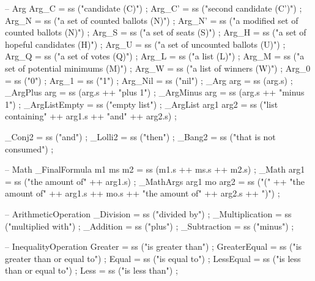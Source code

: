 \begin{lstgf}
{        -- Arg
        Arg_C                           = ss ("candidate (C)") ;
        Arg_C'                          = ss ("second candidate (C')") ;
        Arg_N                           = ss ("a set of counted ballots (N)") ;
        Arg_N'                          = ss ("a modified set of counted ballots (N)") ;
        Arg_S                           = ss ("a set of seats (S)") ;
        Arg_H                           = ss ("a set of hopeful candidates (H)") ;
        Arg_U                           = ss ("a set of uncounted ballots (U)") ;
        Arg_Q                           = ss ("a set of votes (Q)") ;
        Arg_L                           = ss ("a list (L)") ;
        Arg_M                           = ss ("a set of potential minimums (M)") ;
        Arg_W                           = ss ("a list of winners (W)") ;
        Arg_0                           = ss ("0") ;
        Arg_1                           = ss ("1") ;
        Arg_Nil                         = ss ("nil") ;
        _Arg arg                        = ss (arg.s) ;
        _ArgPlus arg                    = ss (arg.s ++ "plus 1") ;
        _ArgMinus arg                   = ss (arg.s ++ "minus 1") ;
        _ArgListEmpty                   = ss ("empty list") ;
        _ArgList arg1 arg2              = ss ("list containing" ++ arg1.s ++ "and" ++ arg2.s) ;
        
        _Conj2                          = ss ("and") ;
        _Lolli2                         = ss ("then") ;
        _Bang2                          = ss ("that is not consumed") ;

        -- Math
        _FinalFormula m1 ms m2          = ss (m1.s ++ ms.s ++ m2.s) ;
        _Math arg1                      = ss ("the amount of" ++ arg1.s) ;
        _MathArgs arg1 mo arg2          = ss ("(" ++ "the amount of" ++ arg1.s ++ mo.s ++ "the amount of" 
		    ++ arg2.s ++ ")") ;

        -- ArithmeticOperation
        _Division                       = ss ("divided by") ;
        _Multiplication                 = ss ("multiplied with") ;
        _Addition                       = ss ("plus") ;
        _Subtraction                    = ss ("minus") ;

        -- InequalityOperation
        Greater                         = ss ("is greater than") ;
        GreaterEqual                    = ss ("is greater than or equal to") ;
        Equal                           = ss ("is equal to") ;
        LessEqual                       = ss ("is less than or equal to") ;
        Less                            = ss ("is less than") ;
}
\end{lstgf}